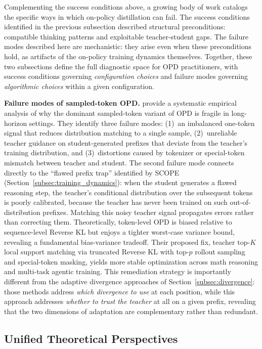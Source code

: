 \documentclass{article} %
\begin{document}
Complementing the success conditions above, a growing body of work catalogs the specific ways in which on-policy distillation can fail. The success conditions identified in the previous subsection described structural preconditions: compatible thinking patterns and exploitable teacher-student gaps. The failure modes described here are mechanistic: they arise even when these preconditions hold, as artifacts of the on-policy training dynamics themselves. Together, these two subsections define the full diagnostic space for OPD practitioners, with success conditions governing \emph{configuration choices} and failure modes governing \emph{algorithmic choices} within a given configuration.

\textbf{Failure modes of sampled-token OPD.}
\citet{2603.25562} provide a systematic empirical analysis of why the dominant sampled-token variant of OPD is fragile in long-horizon settings. They identify three failure modes: (1)~an imbalanced one-token signal that reduces distribution matching to a single sample, (2)~unreliable teacher guidance on student-generated prefixes that deviate from the teacher's training distribution, and (3)~distortions caused by tokenizer or special-token mismatch between teacher and student. The second failure mode connects directly to the ``flawed prefix trap'' identified by SCOPE~\citep{zheng2026scope} (Section~\ref{subsec:training_dynamics}): when the student generates a flawed reasoning step, the teacher's conditional distribution over the subsequent tokens is poorly calibrated, because the teacher has never been trained on such out-of-distribution prefixes. Matching this noisy teacher signal propagates errors rather than correcting them. Theoretically, token-level OPD is biased relative to sequence-level Reverse KL but enjoys a tighter worst-case variance bound, revealing a fundamental bias-variance tradeoff. Their proposed fix, teacher top-$K$ local support matching via truncated Reverse KL with top-$p$ rollout sampling and special-token masking, yields more stable optimization across math reasoning and multi-task agentic training. This remediation strategy is importantly different from the adaptive divergence approaches of Section~\ref{subsec:divergence}: those methods address \emph{which divergence to use} at each position, while this approach addresses \emph{whether to trust the teacher} at all on a given prefix, revealing that the two dimensions of adaptation are complementary rather than redundant.

\subsection{Unified Theoretical Perspectives}
\label{subsec:theory}
\end{document}
